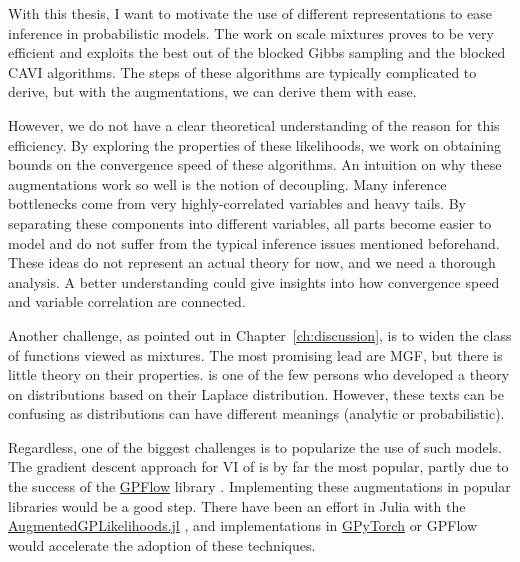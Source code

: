 

\graphicspath{{9_conclusion/figures/}}
With this thesis, I want to motivate the use of different representations to ease inference in probabilistic models.
The work on scale mixtures proves to be very efficient and exploits the best out of the blocked Gibbs sampling and the blocked \ac{CAVI} algorithms.
The steps of these algorithms are typically complicated to derive, but with the augmentations, we can derive them with ease.

However, we do not have a clear theoretical understanding of the reason for this efficiency.
By exploring the properties of these likelihoods, we work on obtaining bounds on the convergence speed of these algorithms.
An intuition on why these augmentations work so well is the notion of decoupling.
Many inference bottlenecks come from very highly-correlated variables and heavy tails.
By separating these components into different variables, all parts become easier to model and do not suffer from the typical inference issues mentioned beforehand.
These ideas do not represent an actual theory for now, and we need a thorough analysis.
A better understanding could give insights into how convergence speed and variable correlation are connected.

Another challenge, as pointed out in Chapter~\ref{ch:discussion}, is to widen the class of functions viewed as mixtures.
The most promising lead are \acf{MGF}, but there is little theory on their properties.
\citet{schwartz1952transformation} is one of the few persons who developed a theory on distributions based on their Laplace distribution. However, these texts can be confusing as distributions can have different meanings (analytic or probabilistic).

Regardless, one of the biggest challenges is to popularize the use of such models.
The gradient descent approach for \ac{VI} of \citet{Hensman2015} is by far the most popular, partly due to the success of the \href{https://github.com/GPflow/GPflow}{GPFlow} library \cite{GPflow2017}.
Implementing these augmentations in popular libraries would be a good step.
There have been an effort in Julia with the \href{https://github.com/JuliaGaussianProcesses/AugmentedGPLikelihoods.jl}{AugmentedGPLikelihoods.jl} \cite{theo_galy_fajou_2022_6347022}, and implementations in \href{https://gpytorch.ai/}{GPyTorch} \cite{gardner2018gpytorch} or GPFlow would accelerate the adoption of these techniques.



